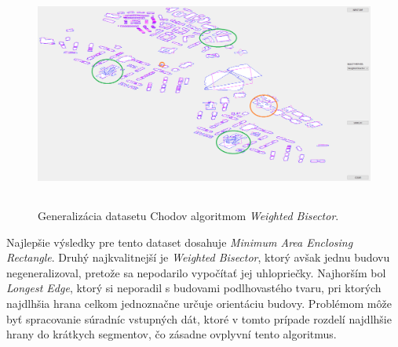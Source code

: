 \documentclass[11pt]{article}
\begin{document}
\begin{figure}[h]
\captionsetup{justification=centering}
\centering
\includegraphics[width=14.65cm, height=7.5cm]{images/chodov_bi.png}
\caption{Generalizácia datasetu Chodov algoritmom \textit{Weighted Bisector}.}
\label{fig:obr21}
\end{figure}

Najlepšie výsledky pre tento dataset dosahuje \textit{Minimum Area Enclosing Rectangle}. Druhý najkvalitnejší je \textit{Weighted Bisector}, ktorý avšak jednu budovu negeneralizoval, pretože sa nepodarilo vypočítať jej uhlopriečky. Najhorším bol \textit{Longest Edge}, ktorý si neporadil s budovami podlhovastého tvaru, pri ktorých najdlhšia hrana celkom jednoznačne určuje orientáciu budovy. Problémom môže byť spracovanie súradníc vstupných dát, ktoré v tomto prípade rozdelí najdlhšie hrany do krátkych segmentov, čo zásadne ovplyvní tento algoritmus.

\newpage
\end{document}
